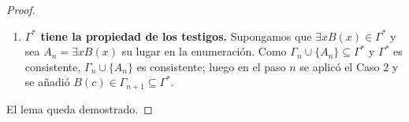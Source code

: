 \begin{proof}
\begin{enumerate}
    Si $A_n \notin \Gamma^*$, es porque en el paso $n$ el conjunto $\Gamma_n \cup \{A_n\}$ era inconsistente ($\Gamma_n \cup \{A_n\} \vdash \bot$), lo que implica que $\Gamma_n \vdash \neg A_n$ y, por ende, $\Gamma^* \vdash \neg A_n$. Cuando el proceso inductivo alcanza el paso $k$ correspondiente a la fórmula $\neg A_n$, el conjunto $\Gamma_k \cup \{\neg A_n\}$ tiene que ser consistente; en efecto, si $\Gamma_k \cup \{\neg A_n\} \vdash \bot$, se tendría $\Gamma_k \vdash A_n$, y en consecuencia $\Gamma^*$ deduciría tanto $A_n$ como $\neg A_n$ ($\Gamma^* \vdash \bot$), lo cual contradiría que $\Gamma^*$ es consistente (punto 1). Como además $\neg A_n$ no es existencial, en el paso $k$ se aplicó el Caso 2 y se incorporó $\neg A_n \in \Gamma_{k+1} \subseteq \Gamma^*$. Por tanto, para toda sentencia $A$, o bien $A \in \Gamma^*$ o bien $\neg A \in \Gamma^*$.
    \item \textbf{$\Gamma^*$ tiene la propiedad de los testigos.} Supongamos que $\exists x B(x) \in \Gamma^*$ y sea $A_n = \exists x B(x)$ su lugar en la enumeración. Como $\Gamma_n \cup \{A_n\} \subseteq \Gamma^*$ y $\Gamma^*$ es consistente, $\Gamma_n \cup \{A_n\}$ es consistente; luego en el paso $n$ se aplicó el Caso 2 y se añadió $B(c) \in \Gamma_{n+1} \subseteq \Gamma^*$.
\end{enumerate}
El lema queda demostrado.
\end{proof}

